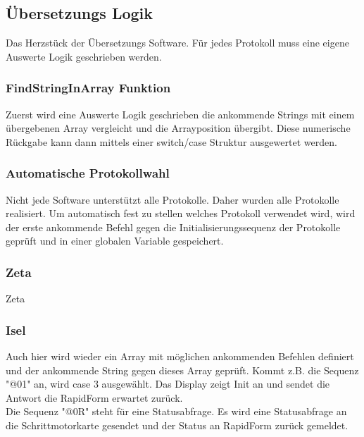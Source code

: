 \subsection{Übersetzungs Logik}
Das Herzstück der Übersetzungs Software. Für jedes Protokoll muss eine eigene Auswerte Logik geschrieben werden. 
\subsubsection{FindStringInArray Funktion}
Zuerst wird eine Auswerte Logik geschrieben die ankommende Strings mit einem übergebenen Array vergleicht und die Arrayposition übergibt. Diese numerische Rückgabe kann dann mittels einer switch/case Struktur ausgewertet werden.
\lstset{language=C, basicstyle=\footnotesize, showstringspaces=false, tabsize=8}

\subsubsection{Automatische Protokollwahl}
Nicht jede Software unterstützt alle Protokolle. Daher wurden alle Protokolle realisiert. Um automatisch fest zu stellen welches Protokoll verwendet wird, wird der erste ankommende Befehl gegen die Initialisierungssequenz der Protokolle geprüft und in einer globalen Variable gespeichert.
\lstset{language=C, basicstyle=\footnotesize, showstringspaces=false, tabsize=8}

\subsubsection{Zeta}
Zeta
\subsubsection{Isel}
Auch hier wird wieder ein Array mit möglichen ankommenden Befehlen definiert und der ankommende String gegen dieses Array geprüft. Kommt z.B. die Sequenz "@01" an, wird case 3 ausgewählt. Das Display zeigt Init an und sendet die Antwort die RapidForm erwartet zurück.\\
Die Sequenz "@0R" steht für eine Statusabfrage. Es wird eine Statusabfrage an die Schrittmotorkarte gesendet und der Status an RapidForm zurück gemeldet.
\lstset{language=C, basicstyle=\footnotesize, showstringspaces=false, tabsize=8}

